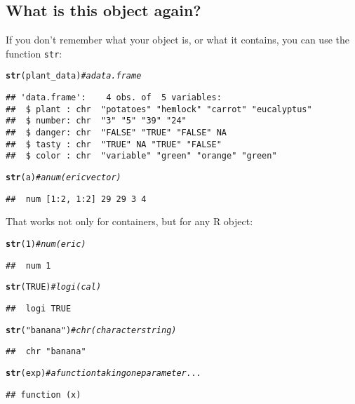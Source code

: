\documentclass[12pt,a4paper]{scrartcl}\usepackage[]{graphicx}\usepackage[]{color}
\makeatletter
\newcommand{\hlnum}[1]{\textcolor[rgb]{0.686,0.059,0.569}{#1}}%
\newcommand{\hlstr}[1]{\textcolor[rgb]{0.192,0.494,0.8}{#1}}%
\newcommand{\hlcom}[1]{\textcolor[rgb]{0.678,0.584,0.686}{\textit{#1}}}%
\newcommand{\hlstd}[1]{\textcolor[rgb]{0.345,0.345,0.345}{#1}}%
\newcommand{\hlkwd}[1]{\textcolor[rgb]{0.737,0.353,0.396}{\textbf{#1}}}%
\newenvironment{kframe}{%
 \def\at@end@of@kframe{}%
 \ifinner\ifhmode%
  \def\at@end@of@kframe{\end{minipage}}%
  \begin{minipage}{\columnwidth}%
 \fi\fi%
 \def\FrameCommand##1{\hskip\@totalleftmargin \hskip-\fboxsep
 \colorbox{shadecolor}{##1}\hskip-\fboxsep
     \hskip-\linewidth \hskip-\@totalleftmargin \hskip\columnwidth}%
 \MakeFramed {\advance\hsize-\width
   \@totalleftmargin\z@ \linewidth\hsize
   \@setminipage}}%
 {\par\unskip\endMakeFramed%
 \at@end@of@kframe}
\newenvironment{knitrout}{}{} %
\makeatother
\begin{document}
\subsection{What is this object again?}

If you don't remember what your object is, or what it contains, you can use the function \texttt{str}:
\begin{knitrout}
\color{fgcolor}\begin{kframe}
\begin{alltt}
\hlkwd{str}\hlstd{(plant_data)}\hlcom{# a data.frame}
\end{alltt}
\begin{verbatim}
## 'data.frame':	4 obs. of  5 variables:
##  $ plant : chr  "potatoes" "hemlock" "carrot" "eucalyptus"
##  $ number: chr  "3" "5" "39" "24"
##  $ danger: chr  "FALSE" "TRUE" "FALSE" NA
##  $ tasty : chr  "TRUE" NA "TRUE" "FALSE"
##  $ color : chr  "variable" "green" "orange" "green"
\end{verbatim}
\begin{alltt}
\hlkwd{str}\hlstd{(a)} \hlcom{# a num(eric vector)}
\end{alltt}
\begin{verbatim}
##  num [1:2, 1:2] 29 29 3 4
\end{verbatim}
\end{kframe}
\end{knitrout}

That works not only for containers, but for any R object:
\begin{knitrout}
\color{fgcolor}\begin{kframe}
\begin{alltt}
\hlkwd{str}\hlstd{(}\hlnum{1}\hlstd{)} \hlcom{#num(eric)}
\end{alltt}
\begin{verbatim}
##  num 1
\end{verbatim}
\begin{alltt}
\hlkwd{str}\hlstd{(}\hlnum{TRUE}\hlstd{)} \hlcom{# logi(cal)}
\end{alltt}
\begin{verbatim}
##  logi TRUE
\end{verbatim}
\begin{alltt}
\hlkwd{str}\hlstd{(}\hlstr{"banana"}\hlstd{)} \hlcom{#chr (character string)}
\end{alltt}
\begin{verbatim}
##  chr "banana"
\end{verbatim}
\begin{alltt}
\hlkwd{str}\hlstd{(exp)} \hlcom{# a function taking one parameter...}
\end{alltt}
\begin{verbatim}
## function (x)
\end{verbatim}
\end{kframe}
\end{knitrout}
\end{document}
